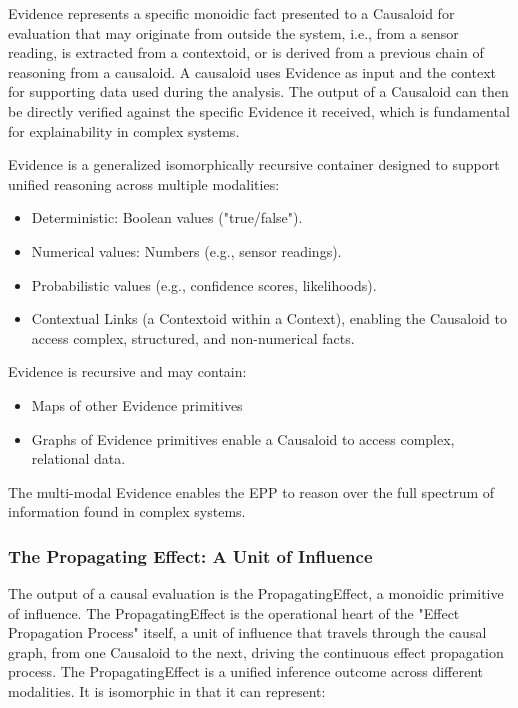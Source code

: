 Evidence represents a specific monoidic fact presented to a Causaloid for evaluation that may originate from outside the system, i.e., from a sensor reading, is extracted from a contextoid, or is derived from a previous chain of reasoning from a causaloid. A causaloid uses Evidence as input and the context for supporting data used during the analysis. The output of a Causaloid can then be directly verified against the specific Evidence it received, which is fundamental for explainability in complex systems.

Evidence is a generalized isomorphically recursive container designed to support unified reasoning across multiple modalities:

\begin{itemize}
	\item Deterministic: Boolean values ("true/false").
	\item Numerical values: Numbers (e.g., sensor readings).
	\item Probabilistic values (e.g., confidence scores, likelihoods).
	\item Contextual Links (a Contextoid within a Context), enabling the Causaloid to access complex, structured, and non-numerical facts.
\end{itemize}

Evidence is recursive and may contain:
\begin{itemize}
	\item Maps of other Evidence primitives
	\item Graphs of Evidence primitives enable a Causaloid to access complex, relational data.
\end{itemize}

The multi-modal Evidence enables the EPP to reason over the full  spectrum of information found in complex systems.

\subsubsection{The Propagating Effect: A Unit of Influence}
\label{sec:ontology_propagating_effect}

The output of a causal evaluation is the PropagatingEffect, a monoidic primitive of influence. The PropagatingEffect is the operational heart of the "Effect Propagation Process" itself, a unit of influence that travels through the causal graph, from one Causaloid to the next, driving the continuous effect propagation process. The PropagatingEffect is a unified inference outcome across different modalities. It is isomorphic in that it can represent:


